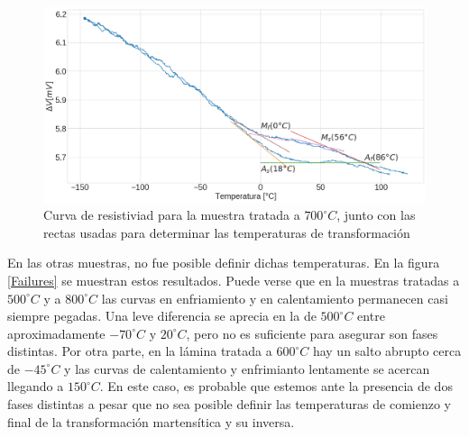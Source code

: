 \documentclass[12pt]{article}
\theoremstyle{definition}
\theoremstyle{remark}
\begin{document}
\begin{figure}[H]
 	\centering
	\includegraphics[scale=0.3]{img/Resistance_700.png}
 	\caption{Curva de resistiviad para la muestra tratada a $700 ^\circ C$, junto con las rectas usadas para determinar las temperaturas de transformación}
	\label{Res700}
\end{figure}

En las otras muestras, no fue posible definir dichas temperaturas. En la figura \ref{Failures} se muestran estos resultados. Puede verse que en la muestras tratadas a $500 ^\circ C$ y a $800 ^\circ C$ las curvas en enfriamiento y en calentamiento permanecen casi siempre pegadas. Una leve diferencia se aprecia en la de  $500 ^\circ C$ entre aproximadamente $-70 ^\circ C$ y $20 ^\circ C$, pero no es suficiente para asegurar son fases distintas. Por otra parte, en la lámina tratada a $600 ^\circ C$ hay un salto abrupto cerca de  $-45 ^\circ C$ y las curvas de calentamiento y enfrimianto lentamente se acercan llegando a $150 ^\circ C$. En este caso, es probable que estemos ante la presencia de dos fases distintas a pesar que no sea posible definir las temperaturas de comienzo y final de la transformación martensítica y su inversa. 
\end{document}
